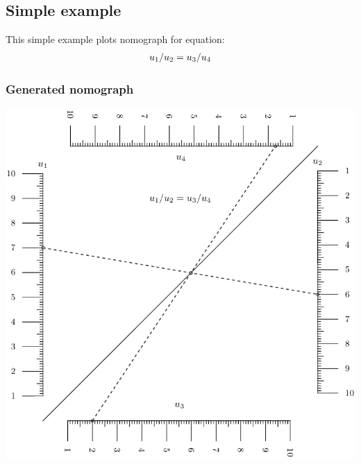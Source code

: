 \documentclass[a4paper,11pt,english]{sphinxmanual}
\begin{document}
\subsection{Simple example}
\label{types/types:id18}
This simple example plots nomograph for equation:
\begin{gather}
\begin{split}u_1 / u_2 = u_3 / u_4\end{split}\notag
\end{gather}

\subsubsection{Generated nomograph}
\label{types/types:id19}
\includegraphics{ex_type4_nomo_1.pdf}
\end{document}

